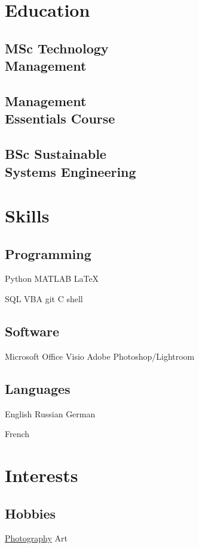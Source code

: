 \documentclass[]{plushcv}
\begin{document}
\begin{minipage}[t]{0.25\textwidth} 


\section{Education} 
	\subsection{MSc Technology\\ Management}
	\sectionsep
	
	\subsection{Management\\ Essentials Course}
	\sectionsep

	\subsection{BSc Sustainable\\Systems Engineering}
	\sectionsep

\section{Skills}
	\subsection{Programming}
	Python  \tb MATLAB \tb \LaTeX
	\subskip
	
	SQL  \tb VBA \tb git \tb C \tb shell 
	\sectionsep
	
	\subsection{Software}
	Microsoft Office \tb Visio \tb Adobe Photoshop/Lightroom
	\sectionsep
	
	\subsection{Languages}
	English \tb Russian \tb German
	\subskip
	
	French
	\sectionsep


\section{Interests}
	\subsection{Hobbies}
	\href{https://daniilaktanka.myportfolio.com/}{Photography} \tb Art

\end{minipage} 
\end{document}
